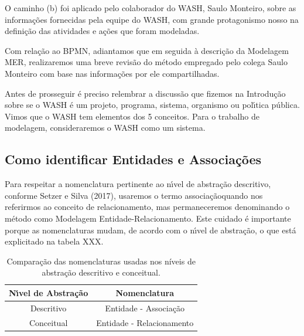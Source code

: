 \documentclass[
12pt,		%
openright,	%
twoside,  %
a4paper,			%
chapter=TITLE,		%
english,			%
french,				%
spanish,			%
brazil				%
]{USPSC-classe/USPSC}
\begin{document}
O caminho (b) foi aplicado pelo colaborador do WASH, Saulo Monteiro, sobre as informa\c{c}\~oes fornecidas pela equipe do WASH, com grande protagonismo nosso na defini\c{c}\~ao das atividades e a\c{c}\~oes que foram modeladas.









Com rela\c{c}\~ao ao BPMN, adiantamos que em seguida \`a descri\c{c}\~ao da Modelagem MER, realizaremos uma breve revis\~ao do m\'etodo empregado pelo colega Saulo Monteiro com base nas informa\c{c}\~oes por ele compartilhadas.









Antes de prosseguir \'e preciso relembrar a discuss\~ao que fizemos na Introdu\c{c}\~ao sobre se o WASH \'e um projeto, programa, sistema, organismo ou pol\'{\i}tica p\'ublica. Vimos que o WASH tem elementos dos 5 conceitos. Para o trabalho de modelagem, consideraremos o WASH como um sistema.









\subsection[Como identificar Entidades e Associa\c{c}\~oes]{Como identificar Entidades e Associa\c{c}\~oes}\label{Como identificar Entidades e Associa\c{c}\~oes}
Para respeitar a nomenclatura pertinente ao n\'{\i}vel de abstra\c{c}\~ao descritivo, conforme  Setzer e Silva (2017), usaremos o termo \textquotedbl associa\c{c}\~ao\textquotedbl  quando nos referirmos ao conceito de \textquotedbl relacionamento\textquotedbl , mas permaneceremos denominando o m\'etodo como \textquotedbl Modelagem Entidade-Relacionamento\textquotedbl . Este cuidado \'e importante porque as nomenclaturas mudam, de acordo com o n\'{\i}vel de abstra\c{c}\~ao, o que est\'a explicitado na tabela XXX.













\begin{table}[htb]
\tiny
\caption{\label{89529551198bad4d68f6da15b612c6b28f6bdd01}Compara\c{c}\~ao das nomenclaturas usadas nos n\'{i}veis de abstra\c{c}\~ao descritivo e conceitual.}

\centering
\begin{tabular}{|c|c|}
\hline
N\'{\i}vel de Abstra\c{c}\~ao  &  Nomenclatura \\
\hline
Descritivo  &  Entidade - Associa\c{c}\~ao \\
Conceitual  &  Entidade - Relacionamento \\
\hline
\end{tabular}
\end{table}
\end{document}
